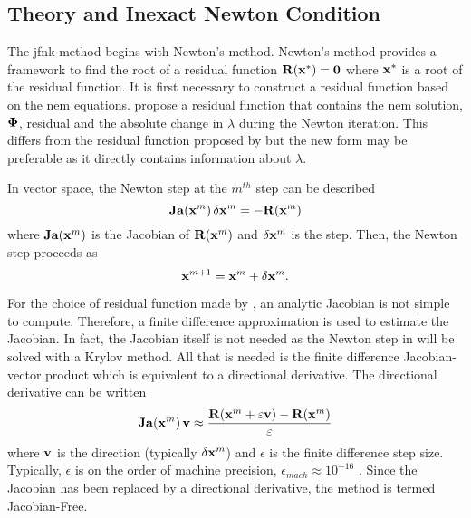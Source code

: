   \subsection{ Theory and Inexact Newton Condition}

    The \gls{jfnk} method begins with Newton's method. Newton's method provides
    a framework to find the root of a residual function 
    $\mathbf{R}(\mathbf{x}^*) = \mathbf{0}$ where $\mathbf{x}^*$ is a root of the residual 
    function. It is first necessary to construct a residual function based on
    the \gls{nem} equations. \citeauthor{qe2paper} propose a residual function
    that contains the \gls{nem} solution, $\mathbf{\Phi}$, residual and the absolute
    change in $\lambda$ during the Newton iteration. This differs from the
    residual function proposed by \citeauthor{gill_azmy} but the new form may be
    preferable as it directly contains information about $\lambda$.
    
    In vector space, the Newton step at the $m^{th}$ step can be described 
    \begin{equation}
      \label{eq:newton_step}
      \mathbf{Ja} (\mathbf{x}^m) \, \delta\mathbf{x}^m = - \mathbf{R}(\mathbf{x}^m)
    \end{equation}
    where $\mathbf{Ja}(\mathbf{x}^m)$ is the Jacobian of $\mathbf{R}(\mathbf{x}^m)$ and 
    $\delta\mathbf{x}^m$ is the step. Then, the Newton step proceeds as
    \begin{equation}
      \mathbf{x}^{m+1} = \mathbf{x}^{m} + \delta\mathbf{x}^{m}.
    \end{equation}

    For the choice of residual function made by \citeauthor{qe2paper}, an 
    analytic Jacobian is not simple to compute. Therefore, a finite difference
    approximation is used to estimate the Jacobian. In fact, the Jacobian itself
    is not needed as the Newton step in  will be solved
    with a Krylov method. All that is needed is the finite difference
    Jacobian-vector product which is equivalent to a directional derivative. The
    directional derivative can be written
    \begin{equation}
      \label{eq:dirder}
      \mathbf{Ja}(\mathbf{x}^m) \, \mathbf{v} \approx \frac{\mathbf{R}(\mathbf{x}^m + \varepsilon \mathbf{v}) - 
        \mathbf{R}(\mathbf{x}^m)}{\varepsilon}
    \end{equation}
    where $\mathbf{v}$ is the direction (typically $\delta\mathbf{x}^m$) and $\epsilon$ is the
    finite difference step size. Typically, $\epsilon$ is on the order of
    machine precision, $\epsilon_{mach} \approx 10^{-16}$
    \cite{qe2paper,gill_azmy,textbookkelley}. Since the Jacobian has been
    replaced by a directional derivative, the method is termed Jacobian-Free.

